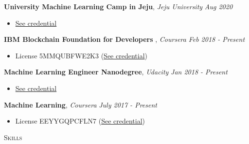 \documentclass[10pt]{article}
\newenvironment{changemargin}[2]{
  \begin{list}{}{
    \setlength{\topsep}{0pt}
    \setlength{\leftmargin}{#1}
    \setlength{\rightmargin}{#2}
    \setlength{\listparindent}{\parindent}
    \setlength{\itemindent}{\parindent}
    \setlength{\parsep}{\parskip}
  }
  \item[]}{\end{list}
}
\newcommand{\lineover}{
	\begin{changemargin}{-0.05in}{-0.05in}
		\vspace*{-8pt}
		\hrulefill \\
		\vspace*{-2pt}
	\end{changemargin}
}
\newcommand{\header}[1]{
	\begin{changemargin}{-0.5in}{-0.5in}
		\scshape{#1}\\
  	\lineover
	\end{changemargin}
}
\newcommand{\labdescription}[1]{
	\begin{changemargin}{0.15in}{0.15in}
    \smallskip
		{#1}
    \medskip
	\end{changemargin}
}
\newcommand{\labtitle}[3]{
	\textbf{#1}, \emph{#2} \hfill \emph{#3}\\
}
\newenvironment{body} {
	\vspace*{-16pt}
	\begin{changemargin}{-0.25in}{-0.5in}
  }
	{\end{changemargin}
}
\begin{document}
\begin{body}
	\vspace{14pt}

  	\labtitle{University Machine Learning Camp in Jeju}{Jeju University}{Aug 2020}
  \labdescription {
  	\begin{itemize} \itemsep -0pt  %
      \item \href{https://drive.google.com/file/d/1lV5w4cdCMVgFnBGu2sHeTigXFEZCX3Sr/view}{See credential}
  	\end{itemize}
  }
  	\labtitle{IBM Blockchain Foundation for Developers }{Coursera}{Feb 2018 - Present}
  \labdescription {
  	\begin{itemize} \itemsep -0pt  %
      \item License 5MMQUBFWE2K3 (\href{https://www.credly.com/badges/a9f84e03-9bc0-462e-8dd2-66ed9c7878c0/linked_in_profile}{See credential})
  	\end{itemize}
  }
  
  	\labtitle{Machine Learning Engineer Nanodegree}{Udacity}{Jan 2018 - Present}
  \labdescription {
  	\begin{itemize} \itemsep -0pt  %
        \item \href{https://graduation.udacity.com/confirm/AN2EMAQD}{See credential}
  	\end{itemize}
  }

  	\labtitle{Machine Learning}{Coursera}{July 2017 - Present}
  \labdescription {
  	\begin{itemize} \itemsep -0pt  %
      \item License EEYYGQPCFLN7 (\href{https://www.coursera.org/account/accomplishments/verify/EEYYGQPCFLN7}{See credential})
  	\end{itemize}
  }
  


\end{body}

\medskip

\header{Skills}
\end{document}
